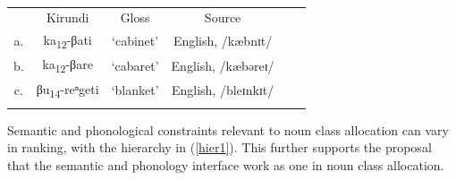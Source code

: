 \documentclass[output=paper,colorlinks,citecolor=brown,
]{langscibook}
\begin{document}
\begin{table}
\caption{}
\label{tab:kinchsular:english}
\begin{tabular}{|c|c|c|c|c|c|}
  \lsptoprule
        & {Kirundi} & {Gloss} & {Source} \\
        a. & ka\textsubscript{12}-βati & `cabinet' & English, /kæbnɪt/ \\
        b. & ka\textsubscript{12}-βare & `cabaret' & English, /kæbəreɪ/ \\
        c. & βu\textsubscript{14}-reⁿgeti & `blanket' & English, /bleɪnkɪt/ \\       
  \lspbottomrule
\end{tabular}
\end{table}

\begin{table}
\ShadingOn
  \caption{Evaluation of /bleɪnkɪt/}
  \label{tab:kinchsular:blankettableau}
\end{table}

\begin{table}
\ShadingOn
  \caption{Evaluation of /kæbnɪt/}
  \label{tab:kinchsular:cabinettableau}
\end{table}

Semantic and phonological constraints relevant to noun class allocation can vary in ranking, with the hierarchy in (\ref{hier1}). This further supports the proposal that the semantic and phonology interface work as one in noun class allocation. 
\end{document}
